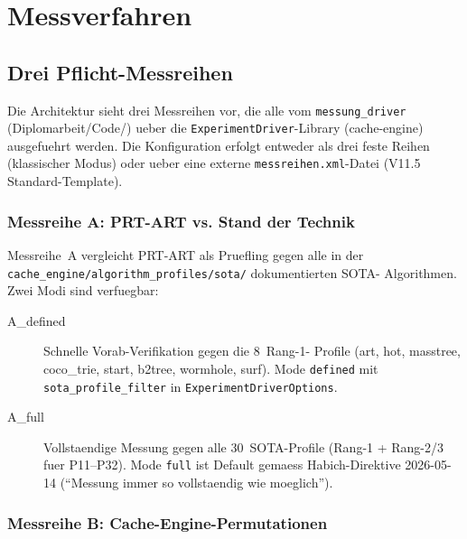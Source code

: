 \chapter{Messverfahren}\label{ch:messverfahren}


\section{Drei Pflicht-Messreihen}

Die Architektur sieht drei Messreihen vor, die alle vom
\texttt{messung\_driver} (Diplomarbeit/Code/) ueber die
\texttt{ExperimentDriver}-Library (cache-engine) ausgefuehrt werden.
Die Konfiguration erfolgt entweder als drei feste Reihen
(klassischer Modus) oder ueber eine externe
\texttt{messreihen.xml}-Datei (V11.5 Standard-Template).

\subsection{Messreihe A: PRT-ART vs. Stand der Technik}

Messreihe~A vergleicht PRT-ART als Pruefling gegen alle in der
\texttt{cache\_engine/algorithm\_profiles/sota/} dokumentierten SOTA-
Algorithmen. Zwei Modi sind verfuegbar:

\begin{description}
    \item[A\_defined] Schnelle Vorab-Verifikation gegen die 8~Rang-1-
          Profile (art, hot, masstree, coco\_trie, start, b2tree,
          wormhole, surf). Mode \texttt{defined} mit
          \texttt{sota\_profile\_filter} in
          \texttt{ExperimentDriverOptions}.
    \item[A\_full] Vollstaendige Messung gegen alle 30~SOTA-Profile
          (Rang-1 + Rang-2/3 fuer P11--P32). Mode \texttt{full} ist
          Default gemaess Habich-Direktive 2026-05-14
          (``Messung immer so vollstaendig wie moeglich'').
\end{description}

\subsection{Messreihe B: Cache-Engine-Permutationen}

